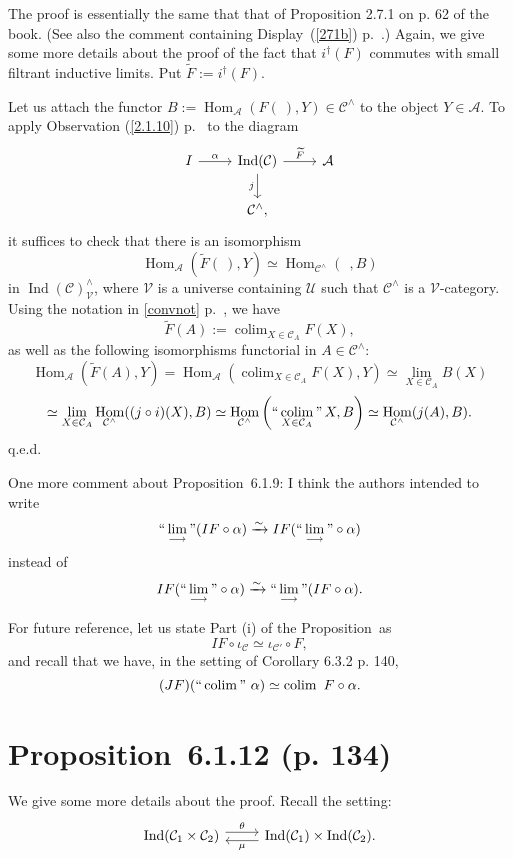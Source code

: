 \documentclass[12pt]{article}
\theoremstyle{remark}%
\newcommand{\A}{\mathcal A}
\newcommand{\C}{\mathcal C}
\newcommand{\U}{\mathcal U}
\newcommand{\V}{\mathcal V}
\newcommand{\pr}{Proposition}
\newcommand{\colim}{\operatornamewithlimits{\underset{\longrightarrow}{lim}}}
\DeclareMathOperator*{\coli}{colim}
\DeclareMathOperator*{\icolim}{``\coli"}
\DeclareMathOperator{\Hom}{Hom}
\DeclareMathOperator{\Ind}{Ind}
\begin{document}
The proof is essentially the same that that of Proposition 2.7.1 on p. 62 of the book. (See also the comment containing Display~(\ref{271b}) p.~\pageref{271b}.) Again, we give some more details about the proof of the fact that $i^\dagger(F)$ commutes with small filtrant inductive limits. Put $\widetilde F:=i^\dagger(F)$. 

Let us attach the functor $B:=\Hom_\A(F(\ ),Y)\in\C^\wedge$ to the object $Y\in\A$. To apply Observation (\ref{2.1.10}) p.~\pageref{2.1.10} to the diagram 
$$
\begin{tikzcd}
I\ar{r}{\alpha}&\Ind(\C)\ar{d}[swap]{j}\ar{r}{\widetilde F}&\A\\
&\C^\wedge,
\end{tikzcd}
$$
it suffices to check that there is an isomorphism 
$$
\Hom_\A\left(\widetilde F(\ ),Y\right)\simeq
\Hom_{\C^\wedge}(\ \ ,B)
$$ 
in $\Ind(\C)^\wedge_\V$, where $\V$ is a universe containing $\U$ such that $\C^\wedge$ is a $\V$-category. Using the notation in \eqref{convnot} p.~\pageref{convnot}, we have 
$$
\widetilde F(A):=\coli_{X\in\C_A}F(X),
$$ 
as well as the following isomorphisms functorial in $A\in\C^\wedge$:
$$
\Hom_\A\left(\widetilde F(A),Y\right)=
\Hom_\A\left(\coli_{X\in\C_A}F(X),Y\right)\simeq
\lim_{X\in\C_A}B(X)
$$
$$
\simeq
\lim_{X\in\C_A}\Hom_{\C^\wedge}((j\circ i)(X),B)
\simeq
\Hom_{\C^\wedge}\left(\icolim_{X\in\C_A}X,B\right)\simeq
\Hom_{\C^\wedge}(j(A),B).
$$ 
q.e.d. 

One more comment about \pr\ 6.1.9: I think the authors intended to write 
% 
\begin{equation}\label{133ii}
``\colim"(IF\circ\alpha)\xrightarrow\sim IF(``\colim"\circ\alpha)
\end{equation} 
% 
instead of 
$$
IF(``\colim"\circ\alpha)\xrightarrow\sim``\colim"(IF\circ\alpha). 
$$ 

For future reference, let us state Part (i) of the \pr\ as 
% 
\begin{equation}\label{133i}
IF\circ\iota_\C\simeq\iota_{\C'}\circ F, 
\end{equation} 
%
and recall that we have, in the setting of Corollary 6.3.2 p. 140, 
%
\begin{equation}\label{140}
(JF)(``\coli"\ \alpha)\simeq\coli\ F\circ\alpha.
\end{equation} 
%
% 
\section{\pr\ 6.1.12 (p. 134)}%
%
We give some more details about the proof. Recall the setting: 
$$
\begin{tikzcd}
\Ind(\C_1\times\C_2)\ar[yshift=0.7ex]{r}{\theta}&\Ind(\C_1)\times\Ind(\C_2).\ar[yshift=-0.7ex]{l}{\mu}
\end{tikzcd}
$$ 
\end{document}

